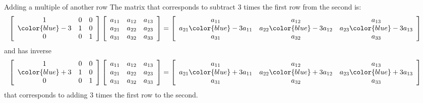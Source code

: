 \documentclass{beamer}
\begin{document}
\begin{frame}{Adding a multiple of another row}
  The matrix that corresponds to subtract $3$ times the first row from the second is:
  \begin{equation*}\!\!\!\!\!\!\!\!\!
    \left[
      \begin{array}{ccc}
        1&0&0\\
        {\color{blue}-3}&1&0\\
        0&0&1
      \end{array}
    \right]
    \left[
      \begin{array}{ccc}
        a_{11}&a_{12}&a_{13}\\
        a_{21}&a_{22}&a_{23}\\
        a_{31}&a_{32}&a_{33}
      \end{array}
    \right]=
    \left[
      \begin{array}{ccc}
        a_{11}&a_{12}&a_{13}\\
        a_{21}{\color{blue}-3}a_{11}&a_{22}{\color{blue}-3}a_{12}&a_{23}{\color{blue}-3}a_{13}\\
        a_{31}&a_{32}&a_{33}
      \end{array}
    \right]
  \end{equation*}\vfill
  and has inverse
   \begin{equation*}\!\!\!\!\!\!\!\!\!
    \left[
      \begin{array}{ccc}
        1&0&0\\
        {\color{blue}+3}&1&0\\
        0&0&1
      \end{array}
    \right]
    \left[
      \begin{array}{ccc}
        a_{11}&a_{12}&a_{13}\\
        a_{21}&a_{22}&a_{23}\\
        a_{31}&a_{32}&a_{33}
      \end{array}
    \right]=
    \left[
      \begin{array}{ccc}
        a_{11}&a_{12}&a_{13}\\
        a_{21}{\color{blue}+3}a_{11}&a_{22}{\color{blue}+3}a_{12}&a_{23}{\color{blue}+3}a_{13}\\
        a_{31}&a_{32}&a_{33}
      \end{array}
    \right]
  \end{equation*}\vfill
  that corresponds to adding $3$ times the first row to the second.
\end{frame}
\end{document}
